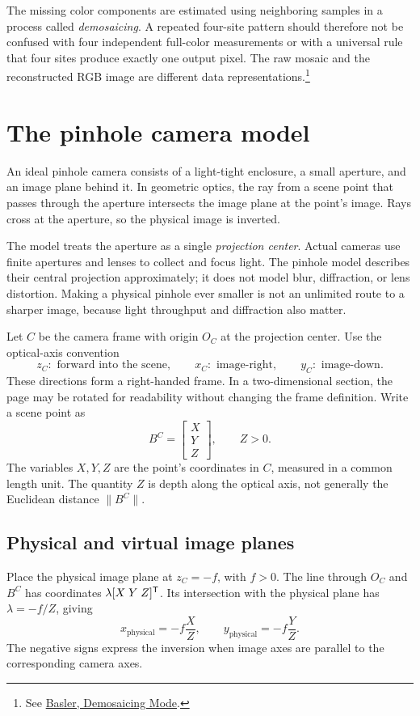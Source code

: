 The missing color components are estimated using neighboring samples in a
process called \emph{demosaicing}. A repeated four-site pattern should
therefore not be confused with four independent full-color measurements or
with a universal rule that four sites produce exactly one output pixel.
The raw mosaic and the reconstructed RGB image are different data
representations.\footnote{See
\href{https://docs.baslerweb.com/demosaicing-mode}{Basler, Demosaicing Mode}.}

\section{The pinhole camera model}
An ideal pinhole camera consists of a light-tight enclosure, a small aperture,
and an image plane behind it. In geometric optics, the ray from a scene point
that passes through the aperture intersects the image plane at the point's
image. Rays cross at the aperture, so the physical image is inverted.

The model treats the aperture as a single \emph{projection center}. Actual
cameras use finite apertures and lenses to collect and focus light. The
pinhole model describes their central projection approximately; it does not
model blur, diffraction, or lens distortion. Making a physical pinhole ever
smaller is not an unlimited route to a sharper image, because light throughput
and diffraction also matter.

Let $C$ be the camera frame with origin $O_C$ at the projection center.
Use the optical-axis convention
\[
 z_C:\text{ forward into the scene},\qquad
 x_C:\text{ image-right},\qquad y_C:\text{ image-down}.
\]
These directions form a right-handed frame. In a two-dimensional section,
the page may be rotated for readability without changing the frame definition.
Write a scene point as
\[
 B^C=\begin{bmatrix}X\\Y\\Z\end{bmatrix},\qquad Z>0.
\]
The variables $X,Y,Z$ are the point's coordinates in $C$, measured in a
common length unit. The quantity $Z$ is depth along the optical axis, not
generally the Euclidean distance $\|B^C\|$.

\subsection{Physical and virtual image planes}
Place the physical image plane at $z_C=-f$, with $f>0$. The line through
$O_C$ and $B^C$ has coordinates $\lambda[X\;Y\;Z]^{\mathsf T}$.
Its intersection with the physical plane has $\lambda=-f/Z$, giving
\[
 x_{\mathrm{physical}}=-f\frac{X}{Z},\qquad
 y_{\mathrm{physical}}=-f\frac{Y}{Z}.
\]
The negative signs express the inversion when image axes are parallel to
the corresponding camera axes.

